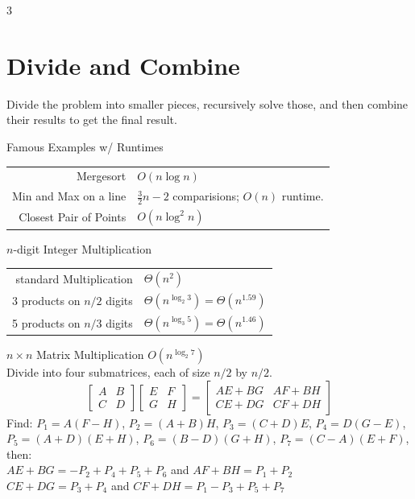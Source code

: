 \documentclass[10pt,a4paper]{article}
\begin{document}
\begin{multicols}{3}
\section{Divide and Combine}

\begin{textbox}{}
 Divide the problem into smaller pieces, recursively solve those, and then combine their results to get the final result.\\
\end{textbox}

\begin{textbox}{Famous Examples w/ Runtimes}
    \begin{tabular}{r|p{}}\scriptsize
        Mergesort  & $O(n\log n)$  \\
        Min and Max on a line & $\frac{3}{2}n - 2$ comparisions; $O(n)$ runtime.\\
        Closest Pair of Points &  $O(n \log^2 n)$ \\
    \end{tabular}
\end{textbox}

\begin{textbox}{$n$-digit Integer Multiplication}
    \begin{tabular}{r|p{}}\scriptsize
        standard Multiplication & $\Theta(n^2)$ \\
        3 products on $n/2$ digits & $\Theta(n^{\log_2 3}) = \Theta(n^{1.59})$ \\
        5 products on $n/3$ digits& $\Theta(n^{\log_3 5}) = \Theta(n^{1.46})$ \\
    \end{tabular}
\linebreak
\end{textbox}

\begin{textbox}{$n \times n$ Matrix Multiplication}
  $O(n^{\log_2 7})$ \\
Divide into four submatrices, each of size $n/2$ by $n/2$.
$$
\left[ \begin{array} {cc} A & B \\ C & D \end{array} \right ]
\left[ \begin{array} {cc} E & F \\ G & H \end{array} \right ]
=
\left[ \begin{array} {cc} AE+BG & AF+BH \\ CE+DG & CF+DH \end{array} \right ]
$$
Find: $P_1 = A(F-H)$, $P_2 = (A+B)H$, $P_3 = (C+D)E$, $P_4 = D(G-E)$, $P_5 = (A+D)(E+H)$, $P_6 = (B-D)(G+H)$, $P_7 = (C-A)(E+F)$, then: \\
\linebreak
$AE+BG = -P_2 + P_4 + P_5 + P_6$ and $AF +BH = P_1 + P_2$\\
$CE+DG = P_3 + P_4$ and $CF +DH = P_1 - P_3 + P_5 + P_7$\\
\end{textbox}


\end{multicols}
\end{document}
